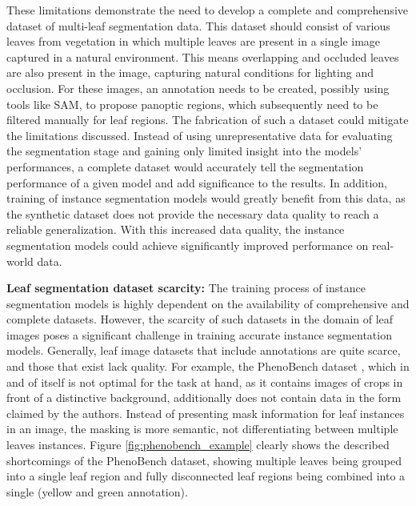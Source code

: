 \documentclass[draft,final]{vutinfth} %
\begin{document}
These limitations demonstrate the need to develop a complete and comprehensive dataset of multi-leaf segmentation data. This dataset should consist of various leaves from vegetation in which multiple leaves are present in a single image captured in a natural environment. This means overlapping and occluded leaves are also present in the image, capturing natural conditions for lighting and occlusion. For these images, an annotation needs to be created, possibly using tools like SAM, to propose panoptic regions, which subsequently need to be filtered manually for leaf regions. The fabrication of such a dataset could mitigate the limitations discussed. Instead of using unrepresentative data for evaluating the segmentation stage and gaining only limited insight into the models' performances, a complete dataset would accurately tell the segmentation performance of a given model and add significance to the results. In addition, training of instance segmentation models would greatly benefit from this data, as the synthetic dataset does not provide the necessary data quality to reach a reliable generalization. With this increased data quality, the instance segmentation models could achieve significantly improved performance on real-world data. 

\iffalse
\textbf{Leaf segmentation dataset scarcity:} The training process of instance segmentation models is highly dependent on the availability of comprehensive and complete datasets. However, the scarcity of such datasets in the domain of leaf images poses a significant challenge in training accurate instance segmentation models. Generally, leaf image datasets that include annotations are quite scarce, and those that exist lack quality. For example, the PhenoBench dataset \cite{weyler_phenobench_2023}, which in and of itself is not optimal for the task at hand, as it contains images of crops in front of a distinctive background, additionally does not contain data in the form claimed by the authors. Instead of presenting mask information for leaf instances in an image, the masking is more semantic, not differentiating between multiple leaves instances. Figure \ref{fig:phenobench_example} clearly shows the described shortcomings of the PhenoBench dataset, showing multiple leaves being grouped into a single leaf region and fully disconnected leaf regions being combined into a single (yellow and green annotation).
\end{document}
